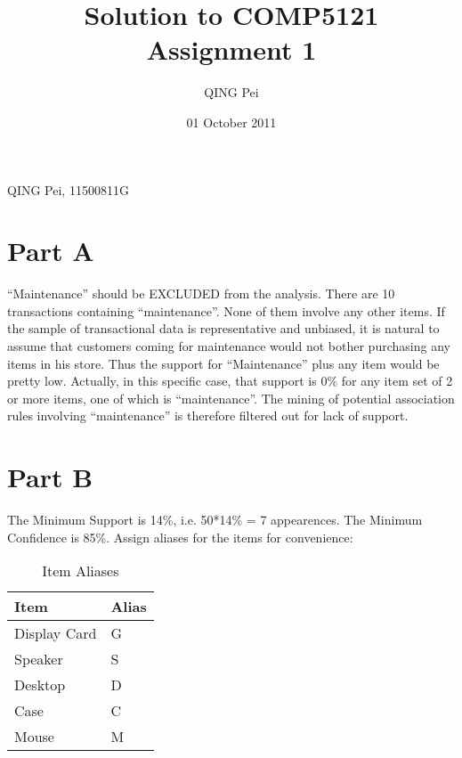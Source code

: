 \documentclass[10pt]{article}
\title{Solution to COMP5121 Assignment 1}
\author{QING Pei}
\date{01 October 2011}
\begin{document}
\maketitle

\setcounter{tocdepth}{3}
\tableofcontents
\vspace*{1cm}
QING Pei, 11500811G

\section{Part A}
\label{sec-1}

``Maintenance'' should be EXCLUDED from the analysis.
There are 10 transactions containing ``maintenance''. None of them involve any other items. If the sample of transactional data is representative and unbiased, it is natural to assume that customers coming for maintenance would not bother purchasing any items in his store. Thus the support for ``Maintenance'' plus any item would be pretty low. Actually, in this specific case, that support is 0\% for any item set of 2 or more items, one of which is ``maintenance''. The mining of potential association rules involving ``maintenance'' is therefore filtered out for lack of support.

\section{Part B}
\label{sec-2}

The Minimum Support is 14\%, i.e. 50*14\% = 7 appearences.
The Minimum Confidence is 85\%.
Assign aliases for the items for convenience:
\begin{table}[htb]
\caption{\label{tbl:alias}Item Aliases}
\begin{center}
\begin{tabular}{ll}
 Item          &  Alias  \\
\hline
 Display Card  &  G      \\
 Speaker       &  S      \\
 Desktop       &  D      \\
 Case          &  C      \\
 Mouse         &  M      \\
\end{tabular}
\end{center}
\end{table}
\end{document}
